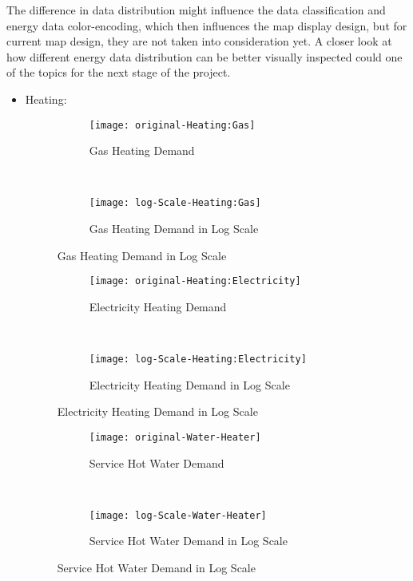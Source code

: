 The difference in data distribution might influence the data
classification and energy data color-encoding, which then influences
the map display design, but for current map design, they are not taken
into consideration yet. A closer look at how different energy data
distribution can be better visually inspected could one of the topics
for the next stage of the project.

\pagebreak
\begin{itemize}
\item Heating:

\begin{figure}[h!]
  \centering
  \begin{subfigure}{0.4\textwidth}
  \centering
  \texttt{[image: original-Heating:Gas]}
  \caption[Gas Heating Demand]{Gas Heating Demand}
  \label{fig:original-Heating:Gas}
\end{subfigure}
~
\begin{subfigure}{0.4\textwidth}
  \centering
  \texttt{[image: log-Scale-Heating:Gas]}
  \caption[Gas Heating Demand]{Gas Heating Demand in Log Scale}
  \label{fig:log-Scale-Heating:Gas}
\end{subfigure}
  \caption[Gas Heating Demand Log]{Gas Heating Demand in Log Scale}
\end{figure}

\begin{figure}[h!]
  \centering
  \begin{subfigure}{0.4\textwidth}
  \centering
  \texttt{[image: original-Heating:Electricity]}
  \caption[Electricity Heating Demand]{Electricity Heating Demand}
  \label{fig:original-Heating:Electricity}
\end{subfigure}
~
\begin{subfigure}{0.4\textwidth}
  \centering
  \texttt{[image: log-Scale-Heating:Electricity]}
  \caption[Electricity Heating Demand]{Electricity Heating Demand in Log Scale}
  \label{fig:log-Scale-Heating:Electricity}
\end{subfigure}
  \caption[Electricity Heating Demand Log]{Electricity Heating Demand in Log Scale}
\end{figure}

\begin{figure}[h!]
  \centering
  \begin{subfigure}{0.4\textwidth}
  \centering
  \texttt{[image: original-Water-Heater]}
  \caption[Service Hot Water Demand]{Service Hot Water Demand}
  \label{fig:original-Water Heater}
\end{subfigure}
~
\begin{subfigure}{0.4\textwidth}
  \centering
  \texttt{[image: log-Scale-Water-Heater]}
  \caption[Service Hot Water Demand]{Service Hot Water Demand in Log Scale}
  \label{fig:log-Scale-Water-Heater}
\end{subfigure}
  \caption[Service Hot Water Demand Log]{Service Hot Water Demand in Log Scale}
\end{figure}


\end{itemize}
